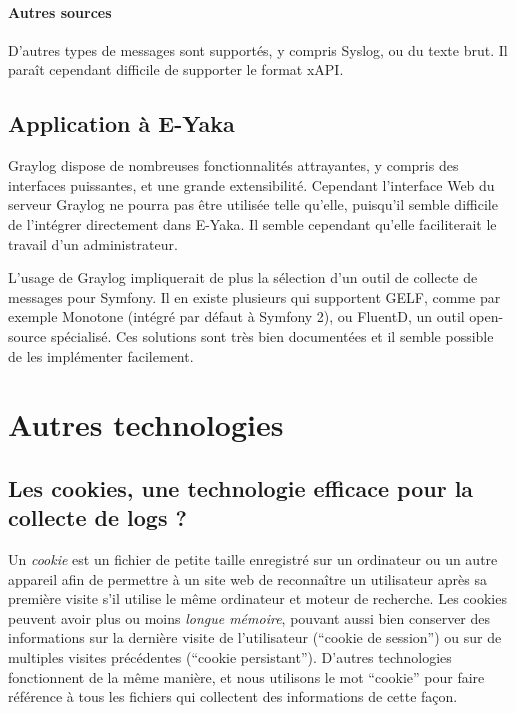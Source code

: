                 \paragraph{Autres sources}
                    D'autres types de messages sont supportés, y compris Syslog, ou du texte brut. Il paraît cependant difficile de supporter le format xAPI.

        \subsection{Application à E-Yaka}

            Graylog dispose de nombreuses fonctionnalités attrayantes, y compris des interfaces puissantes, et une grande extensibilité. Cependant l'interface Web du serveur Graylog ne pourra pas être utilisée telle qu'elle, puisqu'il semble difficile de l'intégrer directement dans E-Yaka. Il semble cependant qu'elle faciliterait le travail d'un administrateur.

            L'usage de Graylog impliquerait de plus la sélection d'un outil de collecte de messages pour Symfony. Il en existe plusieurs qui supportent GELF, comme par exemple Monotone (intégré par défaut à Symfony 2), ou FluentD, un outil open-source spécialisé. Ces solutions sont très bien documentées et il semble possible de les implémenter facilement.

    
    \section{Autres technologies}
    
        \subsection{Les cookies, une technologie efficace pour la collecte de logs ?}
        
            Un \emph{cookie} est un fichier de petite taille enregistré sur un ordinateur ou un autre appareil afin de permettre à un site web de reconnaître un utilisateur après sa première visite s'il utilise le même ordinateur et moteur de recherche. Les cookies peuvent avoir plus ou moins \emph{longue mémoire}, pouvant aussi bien conserver des informations sur la dernière visite de l'utilisateur (\enquote{cookie de session}) ou sur de multiples visites précédentes (\enquote{cookie persistant}). D'autres technologies fonctionnent de la même manière, et nous utilisons le mot \enquote{cookie} pour faire référence à tous les fichiers qui collectent des informations de cette façon.
            
